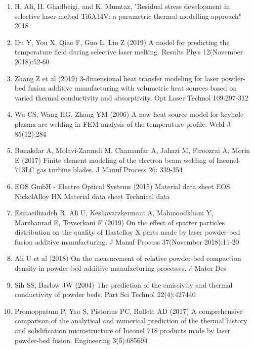 \documentclass[10pt]{article}
\begin{document}
\begin{enumerate}
  \item H. Ali, H. Ghadbeigi, and K. Mumtaz, "Residual stress development in selective laser-melted Ti6A14V: a parametric thermal modelling approach" 2018

  \item Du Y, You X, Qiao F, Guo L, Liu Z (2019) A model for predicting the temperature field during selective laser melting. Results Phys 12(November 2018):52-60

  \item Zhang $\mathrm{Z}$ et al (2019) 3-dimensional heat transfer modeling for laser powder-bed fusion additive manufacturing with volumetric heat sources based on varied thermal conductivity and absorptivity. Opt Laser Technol 109:297-312

  \item Wu CS, Wang HG, Zhang YM (2006) A new heat source model for keyhole plasma arc welding in FEM analysis of the temperature profile. Weld J 85(12):284

  \item Bonakdar A, Molavi-Zarandi M, Chamanfar A, Jahazi M, Firoozrai A, Morin E (2017) Finite element modeling of the electron beam welding of Inconel-713LC gas turbine blades. J Manuf Process 26: 339-354

  \item EOS GmbH - Electro Optical Systems (2015) Material data sheet EOS NickelAlloy HX Material data sheet Technical data

  \item Esmaeilizadeh R, Ali U, Keshavarzkermani A, Mahmoodkhani Y, Marzbanrad E, Toyserkani E (2019) On the effect of spatter particles distribution on the quality of Hastelloy X parts made by laser powder-bed fusion additive manufacturing. J Manuf Process 37(November 2018):11-20

  \item Ali U et al (2018) On the measurement of relative powder-bed compaction density in powder-bed additive manufacturing processes. J Mater Des

  \item Sih SS, Barlow JW (2004) The prediction of the emissivity and thermal conductivity of powder beds. Part Sci Technol 22(4):427440

  \item Promoppatum P, Yao S, Pistorius PC, Rollett AD (2017) A comprehensive comparison of the analytical and numerical prediction of the thermal history and solidification microstructure of Inconel 718 products made by laser powder-bed fusion. Engineering 3(5):685694


\end{enumerate}
\end{document}
